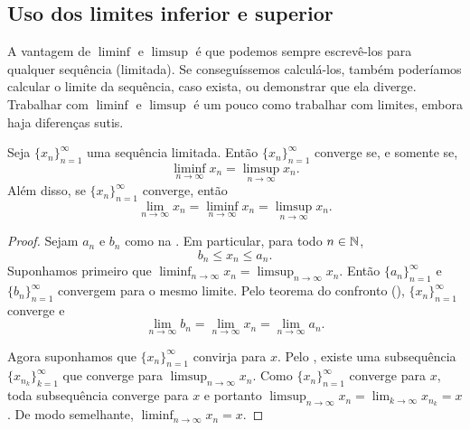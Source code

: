 \subsection{Uso dos limites inferior e superior}

A vantagem de $\liminf$ e $\limsup$ é que podemos sempre escrevê-los
para qualquer sequência (limitada).
Se conseguíssemos calculá-los, também poderíamos calcular o limite da
sequência, caso exista, ou demonstrar que ela diverge.
Trabalhar com $\liminf$ e $\limsup$ é um pouco
como trabalhar com limites, embora haja diferenças sutis.

\begin{prop} \label{liminfsupconv:prop}
Seja $\{ x_n \}_{n=1}^\infty$ uma sequência limitada. Então
$\{ x_n \}_{n=1}^\infty$ converge
se, e somente se,
\begin{equation*}
\liminf_{n\to \infty} x_n =
\limsup_{n\to \infty} x_n.
\end{equation*}
Além disso, se $\{ x_n \}_{n=1}^\infty$ converge, então
\begin{equation*}
\lim_{n\to \infty} x_n =
\liminf_{n\to \infty} x_n =
\limsup_{n\to \infty} x_n.
\end{equation*}
\end{prop}

\begin{proof}
Sejam $a_n$ e $b_n$ como na .
Em particular, para todo $n \in {\mathbb{N}}$,
\begin{equation*}
b_n \leq x_n \leq a_n .
\end{equation*}
Suponhamos primeiro que
$\liminf_{n\to\infty} x_n = \limsup_{n\to\infty} x_n$.
Então $\{ a_n \}_{n=1}^\infty$ e $\{ b_n \}_{n=1}^\infty$
convergem para o mesmo limite.
Pelo teorema do confronto
(), $\{ x_n \}_{n=1}^\infty$ converge e
\begin{equation*}
\lim_{n\to \infty} b_n
=
\lim_{n\to \infty} x_n
=
\lim_{n\to \infty} a_n .
\end{equation*}

Agora suponhamos que $\{ x_n \}_{n=1}^\infty$ convirja para $x$.
Pelo ,
existe uma subsequência $\{ x_{n_k} \}_{k=1}^\infty$
que converge para $\limsup_{n\to\infty} x_n$.
Como $\{ x_n \}_{n=1}^\infty$ converge para $x$,
toda subsequência converge para $x$ e
portanto $\limsup_{n\to\infty} x_n = \lim_{k\to\infty} x_{n_k} = x$.
De modo semelhante, $\liminf_{n\to\infty} x_n = x$.
\end{proof}

